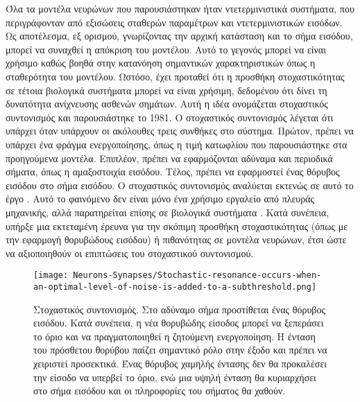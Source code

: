 \documentclass[12pt]{report}
\begin{document}
Όλα τα μοντέλα νευρώνων που παρουσιάστηκαν ήταν ντετερμινιστικά συστήματα, που περιγράφονταν από εξισώσεις σταθερών παραμέτρων και ντετερμινιστικών εισόδων. Ως αποτέλεσμα, εξ ορισμού, γνωρίζοντας την αρχική κατάσταση και το σήμα εισόδου, μπορεί να συναχθεί η απόκριση του μοντέλου. Αυτό το γεγονός μπορεί να είναι χρήσιμο καθώς βοηθά στην κατανόηση σημαντικών χαρακτηριστικών όπως η σταθερότητα του μοντέλου. Ωστόσο, έχει προταθεί ότι η προσθήκη στοχαστικότητας σε τέτοια βιολογικά συστήματα μπορεί να είναι χρήσιμη, δεδομένου ότι δίνει τη δυνατότητα ανίχνευσης ασθενών σημάτων. Αυτή η ιδέα ονομάζεται στοχαστικός συντονισμός και παρουσιάστηκε το 1981. Ο στοχαστικός συντονισμός λέγεται ότι υπάρχει όταν υπάρχουν οι ακόλουθες τρεις συνθήκες στο σύστημα. Πρώτον, πρέπει να υπάρχει ένα φράγμα ενεργοποίησης, όπως η τιμή κατωφλίου που παρουσιάστηκε στα προηγούμενα μοντέλα. Επιπλέον, πρέπει να εφαρμόζονται αδύναμα και περιοδικά σήματα, όπως η αμαξοστοιχία εισόδου. Τέλος, πρέπει να εφαρμοστεί ένας θόρυβος εισόδου στο σήμα εισόδου. Ο στοχαστικός συντονισμός αναλύεται εκτενώς σε αυτό το έργο \cite{Gammaitoni1998}. Αυτό το φαινόμενο δεν είναι μόνο ένα χρήσιμο εργαλείο από πλευράς μηχανικής, αλλά παρατηρείται επίσης σε βιολογικά συστήματα \cite{Honggi2002}. Κατά συνέπεια, υπήρξε μια εκτεταμένη έρευνα για την σκόπιμη προσθήκη στοχαστικότητας (όπως με την εφαρμογή θορυβώδους εισόδου) ή πιθανότητας σε μοντέλα νευρώνων, έτσι ώστε να αξιοποιηθούν οι επιπτώσεις του στοχαστικού συντονισμού.

\begin{figure}[htp]
    \centering
    \texttt{[image: Neurons-Synapses/Stochastic-resonance-occurs-when-an-optimal-level-of-noise-is-added-to-a-subthreshold.png]}
    \caption{Στοχαστικός συντονισμός. Στο αδύναμο σήμα προστίθεται ένας θόρυβος εισόδου. Κατά συνέπεια, η νέα θορυβώδης είσοδος μπορεί να ξεπεράσει το όριο και να πραγματοποιηθεί η ζητούμενη ενεργοποίηση. Η ένταση του πρόσθετου θορύβου παίζει σημαντικό ρόλο στην έξοδο και πρέπει να χειριστεί προσεκτικά. Ένας θόρυβος χαμηλής έντασης δεν θα προκαλέσει την είσοδο να υπερβεί το όριο, ενώ μια υψηλή ένταση θα κυριαρχήσει στο σήμα εισόδου και οι πληροφορίες του σήματος θα χαθούν.}
    \label{fig:lif-neuron}
\end{figure}
\end{document}
